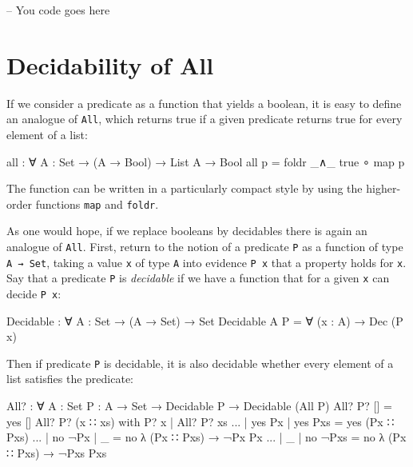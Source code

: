 \begin{fence}
\begin{code}
-- You code goes here
\end{code}
\end{fence}

\hypertarget{decidability-of-all}{%
\section{Decidability of All}\label{decidability-of-all}}

If we consider a predicate as a function that yields a boolean, it is
easy to define an analogue of \texttt{All}, which returns true if a
given predicate returns true for every element of a list:

\begin{fence}
\begin{code}
all : ∀ {A : Set} → (A → Bool) → List A → Bool
all p  =  foldr _∧_ true ∘ map p
\end{code}
\end{fence}

The function can be written in a particularly compact style by using the
higher-order functions \texttt{map} and \texttt{foldr}.

As one would hope, if we replace booleans by decidables there is again
an analogue of \texttt{All}. First, return to the notion of a predicate
\texttt{P} as a function of type \texttt{A\ →\ Set}, taking a value
\texttt{x} of type \texttt{A} into evidence \texttt{P\ x} that a
property holds for \texttt{x}. Say that a predicate \texttt{P} is
\emph{decidable} if we have a function that for a given \texttt{x} can
decide \texttt{P\ x}:

\begin{fence}
\begin{code}
Decidable : ∀ {A : Set} → (A → Set) → Set
Decidable {A} P  =  ∀ (x : A) → Dec (P x)
\end{code}
\end{fence}

Then if predicate \texttt{P} is decidable, it is also decidable whether
every element of a list satisfies the predicate:

\begin{fence}
\begin{code}
All? : ∀ {A : Set} {P : A → Set} → Decidable P → Decidable (All P)
All? P? []                                 =  yes []
All? P? (x ∷ xs) with P? x   | All? P? xs
...                 | yes Px | yes Pxs     =  yes (Px ∷ Pxs)
...                 | no ¬Px | _           =  no λ{ (Px ∷ Pxs) → ¬Px Px   }
...                 | _      | no ¬Pxs     =  no λ{ (Px ∷ Pxs) → ¬Pxs Pxs }
\end{code}
\end{fence}

